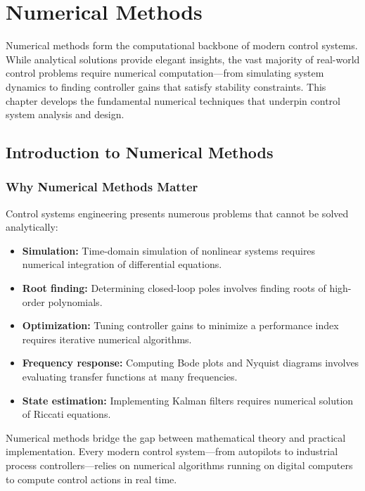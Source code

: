 
\chapter{Numerical Methods}
\label{ch:numerical}

Numerical methods form the computational backbone of modern control systems. While analytical solutions provide elegant insights, the vast majority of real-world control problems require numerical computation---from simulating system dynamics to finding controller gains that satisfy stability constraints. This chapter develops the fundamental numerical techniques that underpin control system analysis and design.

\section{Introduction to Numerical Methods}

\subsection{Why Numerical Methods Matter}

Control systems engineering presents numerous problems that cannot be solved analytically:

\begin{itemize}
    \item \textbf{Simulation:} Time-domain simulation of nonlinear systems requires numerical integration of differential equations.
    \item \textbf{Root finding:} Determining closed-loop poles involves finding roots of high-order polynomials.
    \item \textbf{Optimization:} Tuning controller gains to minimize a performance index requires iterative numerical algorithms.
    \item \textbf{Frequency response:} Computing Bode plots and Nyquist diagrams involves evaluating transfer functions at many frequencies.
    \item \textbf{State estimation:} Implementing Kalman filters requires numerical solution of Riccati equations.
\end{itemize}

\begin{keyconceptbox}[title=The Role of Numerical Methods in Control]
Numerical methods bridge the gap between mathematical theory and practical implementation. Every modern control system---from autopilots to industrial process controllers---relies on numerical algorithms running on digital computers to compute control actions in real time.
\end{keyconceptbox}


